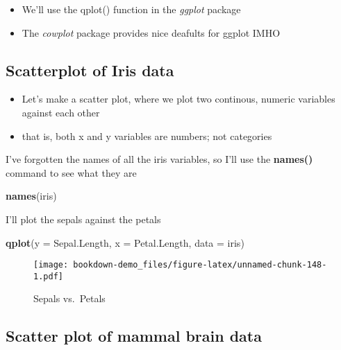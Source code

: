 \documentclass[]{book}
\newenvironment{Shaded}{\begin{snugshade}}{\end{snugshade}}
\newcommand{\KeywordTok}[1]{\textcolor[rgb]{0.13,0.29,0.53}{\textbf{#1}}}
\newcommand{\DataTypeTok}[1]{\textcolor[rgb]{0.13,0.29,0.53}{#1}}
\newcommand{\NormalTok}[1]{#1}
\providecommand{\tightlist}{%
  \setlength{\itemsep}{0pt}\setlength{\parskip}{0pt}}
\theoremstyle{definition}
\theoremstyle{definition}
\theoremstyle{definition}
\theoremstyle{remark}
\begin{document}
\begin{itemize}
\tightlist
\item
  We'll use the qplot() function in the \emph{ggplot} package
\item
  The \emph{cowplot} package provides nice deafults for ggplot IMHO
\end{itemize}

\subsection{Scatterplot of Iris data}\label{scatterplot-of-iris-data}

\begin{itemize}
\tightlist
\item
  Let's make a scatter plot, where we plot two continous, numeric
  variables against each other
\item
  that is, both x and y variables are numbers; not categories
\end{itemize}

I've forgotten the names of all the iris variables, so I'll use the
\textbf{names()} command to see what they are

\begin{Shaded}
\begin{Highlighting}[]
\KeywordTok{names}\NormalTok{(iris)}
\end{Highlighting}
\end{Shaded}

I'll plot the sepals against the petals

\begin{Shaded}
\begin{Highlighting}[]
\KeywordTok{qplot}\NormalTok{(}\DataTypeTok{y =}\NormalTok{ Sepal.Length,}
      \DataTypeTok{x =}\NormalTok{ Petal.Length, }
      \DataTypeTok{data =}\NormalTok{ iris)}
\end{Highlighting}
\end{Shaded}

\begin{figure}
\centering
\texttt{[image: bookdown-demo\_files/figure-latex/unnamed-chunk-148-1.pdf]}
\caption{\label{fig:unnamed-chunk-148}Sepals vs.~Petals}
\end{figure}

\subsection{Scatter plot of mammal brain
data}\label{scatter-plot-of-mammal-brain-data}
\end{document}
